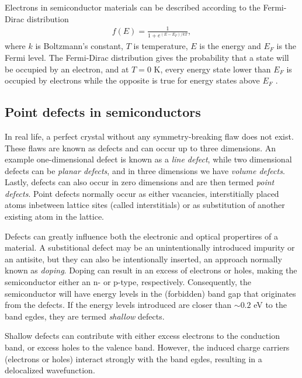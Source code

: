Electrons in semiconductor materials can be described according to the Fermi-Dirac distribution
\begin{align*}
  f(E) = \frac{1}{1+e^{(E-E_F)/kT}},
\end{align*}
where $k$ is Boltzmann's constant, $T$ is temperature, $E$ is the energy and $E_F$ is the Fermi level. The Fermi-Dirac distribution gives the probability that a state will be occupied by an electron, and at $T=0$ K, every energy state lower than $E_F$ is occupied by electrons while the opposite is true for energy states above $E_F$ \cite{BenStreetman2015}.

\subsection{Point defects in semiconductors}

In real life, a perfect crystal without any symmetry-breaking flaw does not exist. These flaws are known as defects and can occur up to three dimensions. An example one-dimensional defect is known as a \textit{line defect}, while two dimensional defects can be \textit{planar defects}, and in three dimensions we have \textit{volume defects}. Lastly, defects can also occur in zero dimensions and are then termed \textit{point defects}. Point defects normally occur as either vacancies, interstitially placed atoms inbetween lattice sites (called interstitials) or as substitution of another existing atom in the lattice.

Defects can greatly influence both the electronic and optical propertires of a material. A substitional defect may be an unintentionally introduced impurity or an antisite, but they can also be intentionally inserted, an approach normally known as \textit{doping}. Doping can result in an excess of electrons or holes, making the semiconductor either an n- or p-type, respectively. Consequently, the semiconductor will have energy levels in the (forbidden) band gap that originates from the defects. If the energy levels introduced are closer than $ \sim 0.2$ eV to the band egdes, they are termed \textit{shallow} defects.

Shallow defects can contribute with either excess electrons to the conduction band, or excess holes to the valence band. However, the induced charge carriers (electrons or holes) interact strongly with the band egdes, resulting in a delocalized wavefunction.%

